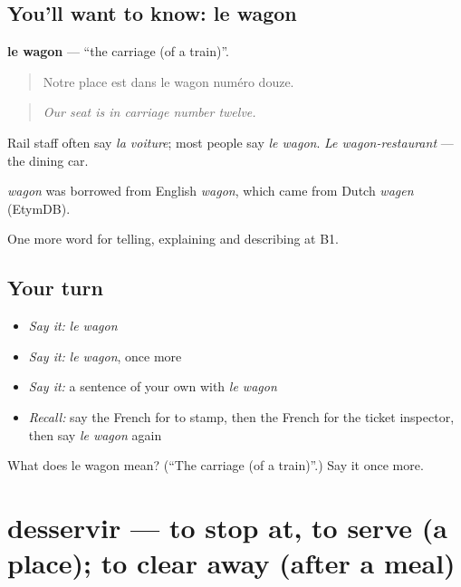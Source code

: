 \subsection*{You'll want to know: le wagon}
\textbf{le wagon} — \textquotedblleft{}the carriage (of a train)\textquotedblright{}.

\begin{quote}
Notre place est dans le wagon numéro douze.
\end{quote}

\begin{quote}
\emph{Our seat is in carriage number twelve.}
\end{quote}

Rail staff often say \emph{la voiture}; most people say \emph{le wagon}. \emph{Le wagon-restaurant} — the dining car.

\begin{cousinweb}
\emph{wagon} was borrowed from English \emph{wagon}, which came from Dutch \emph{wagen} (EtymDB).
\end{cousinweb}

\begin{grammarlens}[title={What you've built}]
One more word for telling, explaining and describing at B1.
\end{grammarlens}

\subsection*{Your turn}
\begin{itemize}
\raggedright
  \item \emph{Say it:} \emph{le wagon}
  \item \emph{Say it:} \emph{le wagon}, once more
  \item \emph{Say it:} a sentence of your own with \emph{le wagon}
  \item \emph{Recall:} say the French for to stamp, then the French for the ticket inspector, then say \emph{le wagon} again
\end{itemize}

\begin{tcolorbox}[breakable,colback=teal!4,colframe=teal!35!black,title={Before you move on}]
What does le wagon mean? (\textquotedblleft{}The carriage (of a train)\textquotedblright{}.) Say it once more.
\end{tcolorbox}
\section[desservir]{desservir — to stop at, to serve (a place); to clear away (after a meal)}

